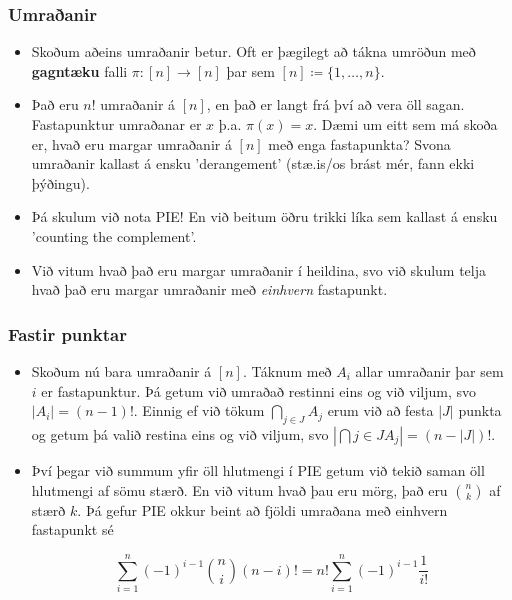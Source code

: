 \documentclass{beamer}
\newcommand\abs[1]{\left|#1\right|}
\begin{document}
\begin{frame}
\frametitle{Umraðanir}

\begin{itemize}

\item<1-> Skoðum aðeins umraðanir betur. Oft er þægilegt að tákna umröðun með \textbf{gagntæku} falli $\pi : [n] \rightarrow [n]$ þar sem $[n] \coloneqq \{1, \dots, n\}$.

\item<2-> Það eru $n!$ umraðanir á $[n]$, en það er langt frá því að vera öll sagan. Fastapunktur umraðanar er $x$ þ.a. $\pi(x) = x$. Dæmi um eitt sem má skoða er, hvað eru margar umraðanir á $[n]$ með enga fastapunkta? Svona umraðanir kallast á ensku 'derangement' (stæ.is/os brást mér, fann ekki þýðingu).

\item<3-> Þá skulum við nota PIE! En við beitum öðru trikki líka sem kallast á ensku 'counting the complement'.

\item<4-> Við vitum hvað það eru margar umraðanir í heildina, svo við skulum telja hvað það eru margar umraðanir með \textit{einhvern} fastapunkt.

\end{itemize}

\end{frame}

\begin{frame}
\frametitle{Fastir punktar}

\begin{itemize}

\item<1-> Skoðum nú bara umraðanir á $[n]$. Táknum með $A_i$ allar umraðanir þar sem $i$ er fastapunktur. Þá getum við umraðað restinni eins og við viljum, svo $\abs{A_i} = (n - 1)!$. Einnig ef við tökum $\bigcap_{j \in J} A_j$ erum við að festa $\abs{J}$ punkta og getum þá valið restina eins og við viljum, svo $\abs{\bigcap{j \in J} A_j} = (n - \abs{J})!$.

\item<2-> Því þegar við summum yfir öll hlutmengi í PIE getum við tekið saman öll hlutmengi af sömu stærð. En við vitum hvað þau eru mörg, það eru $\binom{n}{k}$ af stærð $k$. Þá gefur PIE okkur beint að fjöldi umraðana með einhvern fastapunkt sé

\[\sum_{i = 1}^n (-1)^{i - 1} \binom{n}{i} (n - i)! = n!\sum_{i = 1}^n (-1)^{i - 1}\frac{1}{i!}\]

\end{itemize}

\end{frame}
\end{document}
